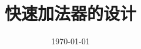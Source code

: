 \documentclass{../source/Experiment}
\title{快速加法器的设计}
\date{\today}
\begin{document}
\makecover
\makeheader
\end{document}
